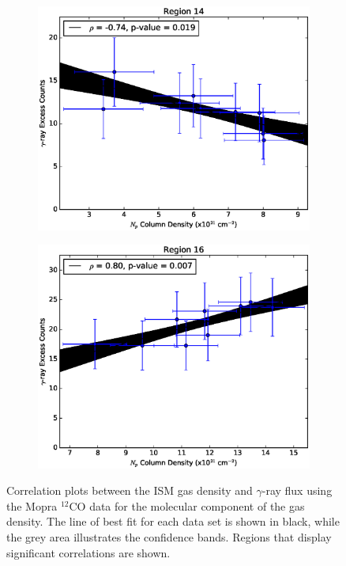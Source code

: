 \documentclass[12pt,a4paper]{article}
\begin{document}
\begin{figure}[H]
\begin{subfigure}{0.5\textwidth}
		\includegraphics[width=0.9\linewidth, height=0.27\textheight]{gamma_mHI_reg14}
		\label{fig:gmHIreg14}
	\end{subfigure}
	\begin{subfigure}{0.5\textwidth}
		\centering
		\includegraphics[width=0.9\linewidth, height=0.27\textheight]{gamma_mHI_reg16}
		\label{fig:gmHIreg16}
	\end{subfigure}
	\caption{Correlation plots between the ISM gas density and $\gamma$-ray flux using the Mopra $^{12}$CO data for the molecular component of the gas density. The line of best fit for each data set is shown in black, while the grey area illustrates the confidence bands. Regions that display significant correlations are shown.}
	\label{fig:regionalgasgammacormop}
\end{figure}
\end{document}
